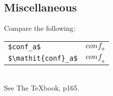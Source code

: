 \documentclass[10pt,twocolumn,letterpaper]{article}
\begin{document}
\subsection{Miscellaneous}

\noindent
Compare the following:\\
\begin{tabular}{ll}
 \verb'$conf_a$' &  $conf_a$ \\
 \verb'$\mathit{conf}_a$' & $\mathit{conf}_a$
\end{tabular}\\
See The \TeX book, p165.





{\small


}
\end{document}
